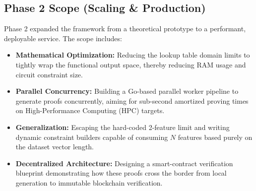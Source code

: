 \subsection{Phase 2 Scope (Scaling \& Production)}
Phase 2 expanded the framework from a theoretical prototype to a performant, deployable service. The scope includes:
\begin{itemize}
    \item \textbf{Mathematical Optimization:} Reducing the lookup table domain limits to tightly wrap the functional output space, thereby reducing RAM usage and circuit constraint size.
    \item \textbf{Parallel Concurrency:} Building a Go-based parallel worker pipeline to generate proofs concurrently, aiming for sub-second amortized proving times on High-Performance Computing (HPC) targets.
    \item \textbf{Generalization:} Escaping the hard-coded 2-feature limit and writing dynamic constraint builders capable of consuming $N$ features based purely on the dataset vector length.
    \item \textbf{Decentralized Architecture:} Designing a smart-contract verification blueprint demonstrating how these proofs cross the border from local generation to immutable blockchain verification.
\end{itemize}
